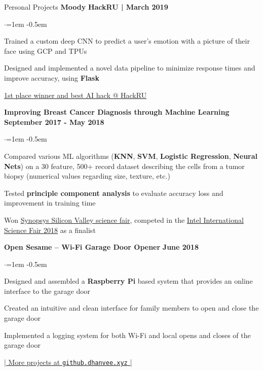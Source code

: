 \documentclass[mm,centered]{resume} %
\begin{document}
\begin{rSection}{Personal Projects}
{\bf Moody}  \hfill {\bf HackRU | March 2019}
 \begin{list}{$\cdot$}{\leftmargin=1em} %
   \itemsep -0.5em \vspace{-0.5em} %
	\item 
		Trained a custom deep CNN to predict a user’s emotion with a picture of their face using GCP and TPUs
	\item 
		Designed and implemented a novel data pipeline to minimize response times and improve accuracy, using \textbf{Flask}
	\item
		\underline{1st place winner and best AI hack @ HackRU}
  \end{list}

{\bf Improving Breast Cancer Diagnosis through Machine Learning} \hfill {\bf September 2017 - May 2018}
 \begin{list}{$\cdot$}{\leftmargin=1em} %
   \itemsep -0.5em \vspace{-0.5em} %
	\item 
		Compared various ML algorithms (\textbf{KNN}, \textbf{SVM}, \textbf{Logistic Regression}, \textbf{Neural Nets}) on a 30 feature, 500+ record dataset describing the cells from a tumor biopsy (numerical values regarding size, texture, etc.)
	\item
		Tested \textbf{principle component analysis} to evaluate accuracy loss and improvement in training time
	\item
		Won \underline{Synopsys Silicon Valley science fair}, competed in the \underline{Intel International Science Fair 2018} as a finalist
  \end{list}

{\bf Open Sesame – Wi-Fi Garage Door Opener}  \hfill {\bf June 2018}
 \begin{list}{$\cdot$}{\leftmargin=1em} %
   \itemsep -0.5em \vspace{-0.5em} %
	\item 
		Designed and assembled a \textbf{Raspberry Pi} based system that provides an online interface to the garage door
	\item
		Created an intuitive and clean interface for family members to open and close the garage door
	\item
		Implemented a logging system for both Wi-Fi and local opens and closes of the garage door
  \end{list}
\vspace{-1mm}
\begin{center}
	\href{http://github.dhanvee.xyz}{| More projects at \texttt{github.dhanvee.xyz} |}
\end{center}
\vspace{-2mm}
\end{rSection}
\end{document}
